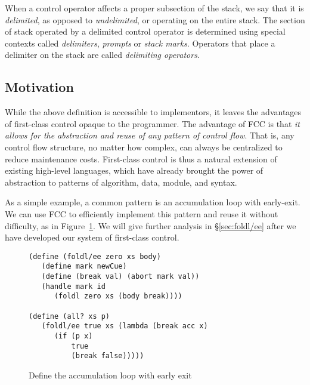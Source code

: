 \documentclass[11pt]{article}
\newcommand{\maybePage}{\newpage}
\begin{document}
When a control operator affects a proper subsection of the stack, we say that it is \emph{delimited}, as opposed to \emph{undelimited}, or operating on the entire stack.
The section of stack operated by a delimited control operator is determined using special contexts called \emph{delimiters}, \emph{prompts} or \emph{stack marks}.
Operators that place a delimiter on the stack are called \emph{delimiting operators}.


\maybePage
\subsection{Motivation}

While the above definition is accessible to implementors, it leaves the advantages of first-class control opaque to the programmer.
The advantage of FCC is that \emph{it allows for the abstraction and reuse of any pattern of control flow}.
That is, any control flow structure, no matter how complex, can always be centralized to reduce maintenance costs.
First-class control is thus a natural extension of existing high-level languages, which have already brought the power of abstraction to patterns of algorithm, data, module, and syntax.

As a simple example, a common pattern is an accumulation loop with early-exit.
We can use FCC to efficiently implement this pattern and reuse it without difficulty, as in Figure~\ref{fig:ex-foldl/ee}.
We will give further analysis in \S\ref{sec:foldl/ee} after we have developed our system of first-class control.

\begin{figure}[H]
\caption{Define the accumulation loop with early exit}
\label{fig:ex-foldl/ee}
\begin{verbatim}
(define (foldl/ee zero xs body)
   (define mark newCue)
   (define (break val) (abort mark val))
   (handle mark id
      (foldl zero xs (body break))))

(define (all? xs p)
   (foldl/ee true xs (lambda (break acc x)
      (if (p x)
          true
          (break false)))))
\end{verbatim}
\end{figure}
\end{document}
